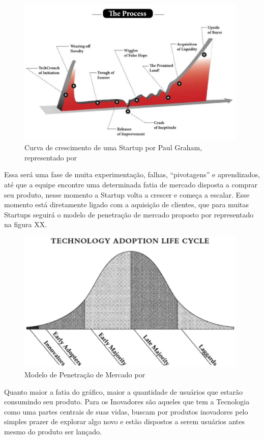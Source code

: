 \begin{figure}[!htb]
\centering
\includegraphics[width=11cm,angle=0]{figuras/startup_curve_by_graham}
\caption{Curva de crescimento de uma Startup por Paul Graham, representado por \cite{Polgar2015}}
\label{Rotulo}
\end{figure}

Essa será uma fase de muita experimentação, falhas, ``pivotagens'' e aprendizados, até que a equipe encontre uma determinada fatia de mercado disposta a comprar seu produto, nesse momento a Startup volta a crescer e começa a escalar. Esse momento está diretamente ligado com a aquisição de clientes, que para muitas Startups seguirá o modelo de penetração de mercado proposto por  representado na figura XX.

\begin{figure}[!htb]
\centering
\includegraphics[width=11cm,angle=0]{figuras/chasm_curve}
\caption{Modelo de Penetração de Mercado por \cite{Moore2014}}
\label{Rotulo}
\end{figure}

Quanto maior a fatia do gráfico, maior a quantidade de usuários que estarão consumindo seu produto. Para  os Inovadores são aqueles que tem a Tecnologia como uma partes centrais de suas vidas, buscam por produtos inovadores pelo simples prazer de explorar algo novo e estão dispostos a serem usuários antes mesmo do produto ser lançado. 

